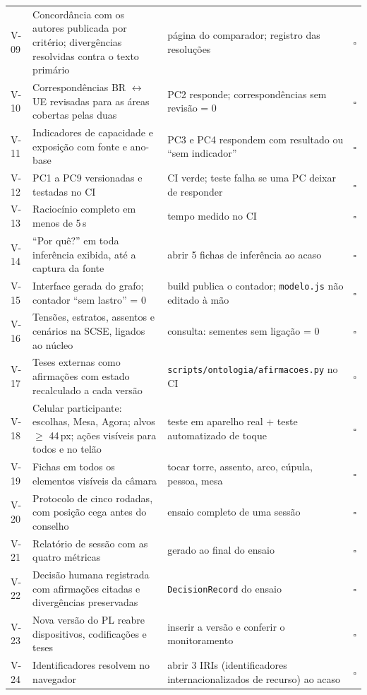 \documentclass[12pt,a4paper,oneside,english,brazil]{abntex2}
\begin{document}
\begin{apendicesenv}
{\begin{longtable}{l >{\raggedright\arraybackslash}p{58mm} >{\raggedright\arraybackslash}p{64mm} c}
V-09 & Concordância com os autores publicada por critério; divergências resolvidas contra o texto primário & página do comparador; registro das resoluções & $\square$\\
V-10 & Correspondências BR $\leftrightarrow$ UE revisadas para as áreas cobertas pelas duas & PC2 responde; correspondências sem revisão = 0 & $\square$\\
V-11 & Indicadores de capacidade e exposição com fonte e ano-base & PC3 e PC4 respondem com resultado ou ``sem indicador'' & $\square$\\
V-12 & PC1 a PC9 versionadas e testadas no CI & CI verde; teste falha se uma PC deixar de responder & $\square$\\
V-13 & Raciocínio completo em menos de 5\,s & tempo medido no CI & $\square$\\
V-14 & ``Por quê?'' em toda inferência exibida, até a captura da fonte & abrir 5 fichas de inferência ao acaso & $\square$\\
V-15 & Interface gerada do grafo; contador ``sem lastro'' = 0 & build publica o contador; \texttt{modelo.js} não editado à mão & $\square$\\
V-16 & Tensões, estratos, assentos e cenários na SCSE, ligados ao núcleo & consulta: sementes sem ligação = 0 & $\square$\\
V-17 & Teses externas como afirmações com estado recalculado a cada versão & \texttt{scripts/ontologia/afirmacoes.py} no CI & $\square$\\
V-18 & Celular participante: escolhas, Mesa, Agora; alvos $\geq$ 44\,px; ações visíveis para todos e no telão & teste em aparelho real + teste automatizado de toque & $\square$\\
V-19 & Fichas em todos os elementos visíveis da câmara & tocar torre, assento, arco, cúpula, pessoa, mesa & $\square$\\
V-20 & Protocolo de cinco rodadas, com posição cega antes do conselho & ensaio completo de uma sessão & $\square$\\
V-21 & Relatório de sessão com as quatro métricas & gerado ao final do ensaio & $\square$\\
V-22 & Decisão humana registrada com afirmações citadas e divergências preservadas & \texttt{DecisionRecord} do ensaio & $\square$\\
V-23 & Nova versão do PL reabre dispositivos, codificações e teses & inserir a versão e conferir o monitoramento & $\square$\\
V-24 & Identificadores resolvem no navegador & abrir 3 IRIs (identificadores internacionalizados de recurso) ao acaso & $\square$\\

\end{longtable}}
\end{apendicesenv}
\end{document}
